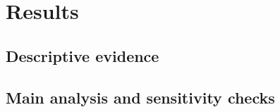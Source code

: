 \section{Results}
\subsection{Descriptive evidence}
\subsection{Main analysis and sensitivity checks}

% 
